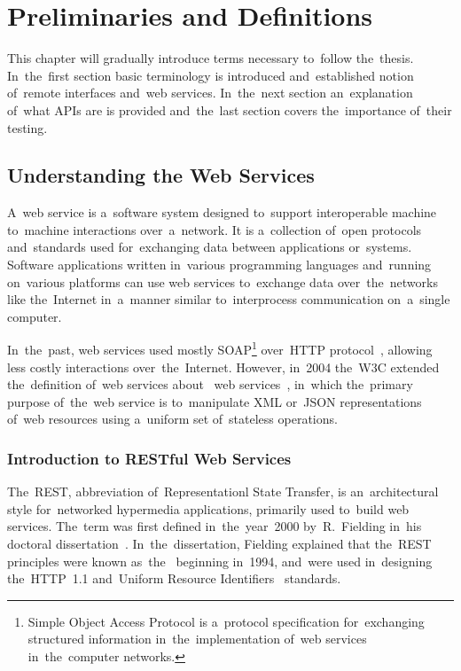 \chapter{Preliminaries and Definitions}
\label{Preliminaries}
This chapter will gradually introduce terms necessary to~follow the~thesis.
In~the~first section basic terminology is introduced and~established notion
of~remote interfaces and~web services. In~the~next section
an~explanation of~what APIs are is provided and~the~last section covers the~importance
of~their testing.



\section{Understanding the Web Services}
\label{WebServices}
A~web service is a~software system designed to~support interoperable machine
to~machine interactions over~a~network. It is a~collection of~open protocols
and~standards used for~exchanging data between applications or~systems. Software
applications written in~various programming languages and~running on~various
platforms can use web services to~exchange data over~the~networks like
the~Internet in~a~manner similar to~interprocess communication on~a~single
computer.

In~the~past, web services used mostly SOAP\footnote{Simple Object Access
Protocol is a~protocol specification for~exchanging structured information
in~the~implementation of~web services in~the~computer networks.} over~HTTP
protocol~\cite{HTTP}, allowing less costly interactions over~the~Internet.
However, in~2004 the~W3C extended the~definition of~web services
about~ web services~\cite{W3CWebServices}, in~which
the~primary purpose of~the~web service is to~manipulate XML or~JSON
representations of~web resources using a~uniform set of~stateless operations.



\subsection{Introduction to RESTful Web Services}
The~REST, abbreviation of~Representationl State Transfer, is an~architectural
style for~networked hypermedia applications, primarily used to~build web
services. The~term was first defined in~the~year~2000 by~R.~Fielding in~his
doctoral dissertation~\cite{FieldingDissertation}. In~the~dissertation, Fielding
explained that the~REST principles were known as~the~
beginning in~1994, and~were used in~designing the~HTTP~1.1 and~Uniform Resource
Identifiers~\cite{URI-RFC} standards.

